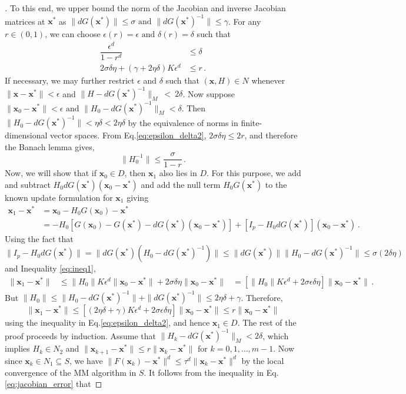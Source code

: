 \documentclass{statsoc}
\newcommand{\bx}{\boldsymbol{x}}
\begin{document}
\begin{proof}[]
To this end, we upper bound the norm of the Jacobian and inverse Jacobian matrices at $\bx^\ast$ as $ \|dG(\bx^\ast)\| \leq \sigma \text{ and } \|dG(\bx^\ast)^{-1}\| \leq \gamma$. For any $r \in (0,1)$, we can choose $\epsilon(r) = \epsilon \text{ and } \delta(r) = \delta$ such that
\begin{align}
    [2\alpha_1\delta + \alpha_2] \dfrac{\epsilon^d}{1 - r^d} &\leq \delta \label{eq:epsilon_delta1}\\ 
    2\sigma \delta \eta + (\gamma + 2\eta \delta)K \epsilon^d &\leq r \label{eq:epsilon_delta2} \,.
\end{align}
If necessary, we may further restrict $\epsilon$ and $\delta$ such that $(\bx,H) \in N$ whenever $\|\bx - \bx^\ast\| < \epsilon$ and $\|H -dG(\bx^\ast)^{-1}\|_M~<~2\delta$. Now suppose $\|\bx_0 - \bx^\ast\| < \epsilon \text{ and } \|H_0 - dG(\bx^\ast)^{-1}\|_M < \delta$. Then  $\|H_0 - dG(\bx^\ast)^{-1}\| < \eta \delta < 2\eta \delta$ by the equivalence of norms in finite-dimensional vector spaces. From Eq.\eqref{eq:epsilon_delta2}, $2 \sigma \delta \eta \leq 2r$, and therefore the Banach lemma gives,
\[
\|H_0^{-1}\| \leq \dfrac{\sigma}{1-r}\,.
\]
Now, we will show that if $\bx_0 \in D$, then $\bx_1$ also lies in $D$. For this purpose, we add and subtract $H_0 dG(\bx^\ast)(\bx_0 - \bx^\ast)$ and add the null term $H_0G(\bx^\ast)$ to the known update formulation for $\bx_1$ giving
\begin{align*}
    \bx_1 - \bx^\ast &= \bx_0 - H_0G(\bx_0) - \bx^\ast \\
    &= -H_0\left[G(\bx_0) - G(\bx^\ast) - dG(\bx^\ast)(\bx_0 - \bx^\ast)\right] + \left[I_p - H_0dG(\bx^\ast)\right](\bx_0 - \bx^\ast)\,.
\end{align*}
Using the fact that $\|I_p - H_0dG(\bx^\ast)\| = \|dG(\bx^\ast)(H_0 - dG(\bx^\ast)^{-1})\| \leq \|dG(\bx^\ast)\|\|H_0 - dG(\bx^\ast)^{-1}\| \leq \sigma (2  \delta \eta)$ and Inequality \eqref{eq:ineq1},
\begin{align*}
    \|\bx_1 - \bx^\ast\| &\leq \|H_0\|K\epsilon^d\|\bx_0 - \bx^\ast\| + 2\sigma \delta \eta \|\bx_0 - \bx^\ast\|
    &= \left[\|H_0\|K \epsilon^d + 2 \sigma \epsilon \delta \eta\right]\|\bx_0 - \bx^\ast\|\,.
\end{align*}
But $\|H_0\| \leq \|H_0 - dG(\bx^\ast)^{-1}\| + \|dG(\bx^\ast)^{-1}\| \leq 2 \eta \delta + \gamma$. Therefore,
\[
\|\bx_1 - \bx^\ast\| \leq [(2 \eta \delta + \gamma)K \epsilon^d + 2 \sigma \epsilon \delta \eta]\|\bx_0 - \bx^\ast\| \leq r\|\bx_0 - \bx^\ast\|
\]
using the inequality in Eq.\eqref{eq:epsilon_delta2}, and hence $\bx_1 \in D$. The rest of the proof proceeds by induction. Assume that $\|H_k - dG(\bx^\ast)^{-1}\|_M < 2\delta$,  which implies  $ H_k \in N_2$ and $\|\bx_{k+1} - \bx^\ast\| \leq r\|\bx_k - \bx^\ast\|$ for $k = 0, 1, \dots, m-1$. Now since $\bx_k \in N_1 \subseteq S$, we have $\|F(\bx_k) - \bx^\ast\|^d \leq \tau^d \|\bx_k - \bx^\ast\|^d$ by the local convergence of the MM algorithm in $S$. It follows from the inequality in Eq.\eqref{eq:jacobian_error} that

\end{proof}
\end{document}
